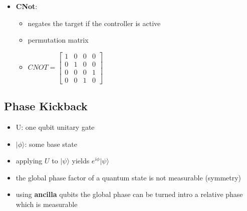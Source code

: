 \documentclass[12pt,a4paper]{article}
\newcommand{\ket}[1]{\vert #1 \rangle}
\begin{document}
\begin{itemize}
\item \textbf{CNot}:
\begin{itemize}
\item negates the target if the controller is active
\item permutation matrix
\item $CNOT = \begin{bmatrix}1 & 0 & 0 & 0\\0 & 1 & 0 & 0\\0 & 0 & 0 & 1\\0 & 0 & 1 & 0 \end{bmatrix}$
\end{itemize} 
\end{itemize}

\subsection{Phase Kickback}
\begin{itemize}
\item U: one qubit unitary gate 
\item $\ket{\phi}$: some base state 
\item applying $U$ to $\ket{\psi}$ yields $e^{i\phi}\ket{\psi}$
\item the global phase factor of a quantum state is not measurable (symmetry)
\item using \textbf{ancilla} qubits the global phase can be turned intro a relative phase which is measurable
\end{itemize}
\end{document}
